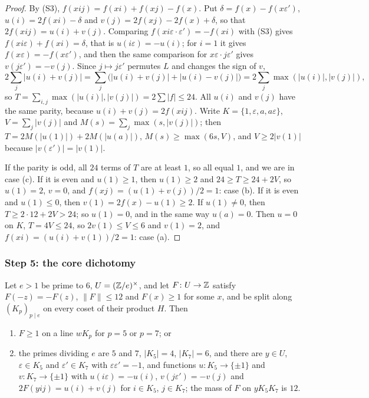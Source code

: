 \begin{proof}
By (S3), $f(xij)=f(xi)+f(xj)-f(x)$. Put $\delta=f(x)-f(x\varepsilon')$,
$u(i)=2f(xi)-\delta$ and $v(j)=2f(xj)-2f(x)+\delta$, so that $2f(xij)=u(i)+
v(j)$. Comparing $f(xi\varepsilon\cdot\varepsilon')=-f(xi)$ with (S3) gives
$f(xi\varepsilon)+f(xi)=\delta$, that is $u(i\varepsilon)=-u(i)$; for $i=1$
it gives $f(x\varepsilon)=-f(x\varepsilon')$, and then the same comparison
for $x\varepsilon\cdot j\varepsilon'$ gives $v(j\varepsilon')=-v(j)$. Since
$j\mapsto j\varepsilon'$ permutes $L$ and changes the sign of $v$,
\[
  2\sum_{j}|u(i)+v(j)|=\sum_{j}\bigl(|u(i)+v(j)|+|u(i)-v(j)|\bigr)
  =2\sum_{j}\max(|u(i)|,|v(j)|),
\]
so $T=\sum_{i,j}\max(|u(i)|,|v(j)|)=2\sum|f|\le24$. All $u(i)$ and $v(j)$
have the same parity, because $u(i)+v(j)=2f(xij)$. Write
$K=\{1,\varepsilon,a,a\varepsilon\}$, $V=\sum_{j}|v(j)|$ and
$M(s)=\sum_{j}\max(s,|v(j)|)$; then $T=2M(|u(1)|)+2M(|u(a)|)$,
$M(s)\ge\max(6s,V)$, and $V\ge2|v(1)|$ because $|v(\varepsilon')|=|v(1)|$.

If the parity is odd, all $24$ terms of $T$ are at least $1$, so all equal
$1$, and we are in case (c). If it is even and $u(1)\ge1$, then $u(1)\ge2$
and $24\ge T\ge24+2V$, so $u(1)=2$, $v=0$, and $f(xj)=(u(1)+v(j))/2=1$: case
(b). If it is even and $u(1)\le0$, then $v(1)=2f(x)-u(1)\ge2$. If $u(1)\ne0$,
then $T\ge2\cdot12+2V>24$; so $u(1)=0$, and in the same way $u(a)=0$. Then
$u=0$ on $K$, $T=4V\le24$, so $2v(1)\le V\le6$ and $v(1)=2$, and
$f(xi)=(u(i)+v(1))/2=1$: case (a).
\end{proof}

\subsubsection*{Step 5: the core dichotomy}

\begin{proposition}\label{prop:core}
Let $e>1$ be prime to $6$, $U=(\mathbb{Z}/e)^{\times}$, and let $F\colon U\to\mathbb{Z}$
satisfy $F(-z)=-F(z)$, $\|F\|\le12$ and $F(x)\ge1$ for some $x$, and be split
along $(K_{p})_{p\mid e}$ on every coset of their product $H$. Then
\begin{enumerate}[label=\textup{(\arabic*)}]
\item $F\ge1$ on a line $wK_{p}$ for $p=5$ or $p=7$; or
\item the primes dividing $e$ are $5$ and $7$, $|K_{5}|=4$, $|K_{7}|=6$, and
there are $y\in U$, $\varepsilon\in K_{5}$ and $\varepsilon'\in K_{7}$ with
$\varepsilon\varepsilon'=-1$, and functions $u\colon K_{5}\to\{\pm1\}$ and
$v\colon K_{7}\to\{\pm1\}$ with $u(i\varepsilon)=-u(i)$,
$v(j\varepsilon')=-v(j)$ and $2F(yij)=u(i)+v(j)$ for $i\in K_{5}$, $j\in
K_{7}$; the mass of $F$ on $yK_{5}K_{7}$ is $12$.
\end{enumerate}
\end{proposition}

